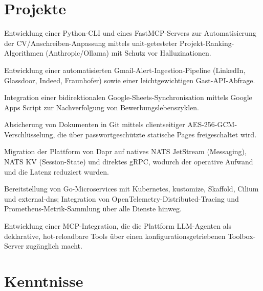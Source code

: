\documentclass[10pt,a4paper]{resume}
\begin{document}
\section{Projekte}

\bullets
  \item Entwicklung einer Python-CLI und eines FastMCP-Servers zur Automatisierung der CV/Anschreiben-Anpassung mittels unit-getesteter Projekt-Ranking-Algorithmen (Anthropic/Ollama) mit Schutz vor Halluzinationen.
  \item Entwicklung einer automatisierten Gmail-Alert-Ingestion-Pipeline (LinkedIn, Glassdoor, Indeed, Fraunhofer) sowie einer leichtgewichtigen Gast-API-Abfrage.
  \item Integration einer bidirektionalen Google-Sheets-Synchronisation mittels Google Apps Script zur Nachverfolgung von Bewerbungslebenszyklen.
  \item Absicherung von Dokumenten in Git mittels clientseitiger AES-256-GCM-Verschlüsselung, die über passwortgeschützte statische Pages freigeschaltet wird.
\bulletsend
\vspace{1.0pt}
\bullets
  \item Migration der Plattform von Dapr auf natives NATS JetStream (Messaging), NATS KV (Session-State) und direktes gRPC, wodurch der operative Aufwand und die Latenz reduziert wurden.
  \item Bereitstellung von Go-Microservices mit Kubernetes, kustomize, Skaffold, Cilium und external-dns; Integration von OpenTelemetry-Distributed-Tracing und Prometheus-Metrik-Sammlung über alle Dienste hinweg.
  \item Entwicklung einer MCP-Integration, die die Plattform LLM-Agenten als deklarative, hot-reloadbare Tools über einen konfigurationsgetriebenen Toolbox-Server zugänglich macht.
\bulletsend

\section{Kenntnisse}
\end{document}
